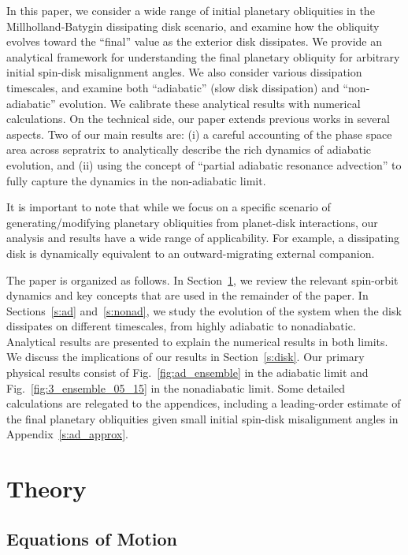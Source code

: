 \documentclass[twocolumn,twocolappendix]{aastex63}
\begin{document}
In this paper, we consider a wide range of initial planetary obliquities in the
Millholland-Batygin dissipating disk scenario, and examine how the obliquity
evolves toward the ``final'' value as the exterior disk dissipates. We provide
an analytical framework for understanding the final planetary obliquity for
arbitrary initial spin-disk misalignment angles. We also consider various
dissipation timescales, and examine both ``adiabatic'' (slow disk dissipation)
and ``non-adiabatic'' evolution. We calibrate these analytical results with
numerical calculations. On the technical side, our paper
extends previous works \citep[such as][]{henrard1982, henrard1987,
millholland_disk} in several aspects. Two of our main results are: (i) a careful
accounting of the phase space area across sepratrix to analytically describe the
rich dynamics of adiabatic evolution, and (ii) using the concept of ``partial
adiabatic resonance advection'' to fully capture the dynamics in the
non-adiabatic limit.

It is important to note that while we focus on a specific scenario of
generating/modifying planetary obliquities from planet-disk interactions, our
analysis and results have a wide range of applicability. For example, a
dissipating disk is dynamically equivalent to an outward-migrating external
companion.

The paper is organized as follows. In Section~\ref{s:eq}, we review the relevant
spin-orbit dynamics and key concepts that are used in the remainder of the
paper. In Sections~\ref{s:ad} and~\ref{s:nonad}, we study the evolution of the
system when the disk dissipates on different timescales, from highly adiabatic
to nonadiabatic. Analytical results are presented to explain the numerical
results in both limits. We discuss the implications of our results in
Section~\ref{s:disk}. Our primary physical results consist of
Fig.~\ref{fig:ad_ensemble} in the adiabatic limit and
Fig.~\ref{fig:3_ensemble_05_15} in the nonadiabatic limit. Some detailed
calculations are relegated to the appendices, including a leading-order
estimate of the final planetary obliquities given small initial spin-disk
misalignment angles in Appendix~\ref{s:ad_approx}.

\section{Theory}\label{s:eq}

\subsection{Equations of Motion}
\end{document}
